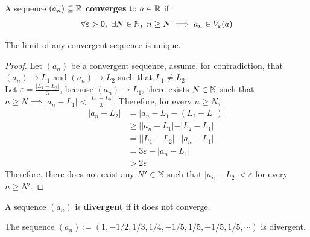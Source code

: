\documentclass[11pt]{article}
\begin{document}
	\begin{definition}
		A sequence $(a_n) \subseteq \mathbb{R}$ \textbf{converges} to $a \in \mathbb{R}$ if 
		\begin{align}
			\forall \varepsilon > 0,\ \exists N \in \mathbb{N},\ n \geq N \implies a_n \in V_\varepsilon(a)
		\end{align}
	\end{definition}
	
	\begin{theorem}
		The limit of any convergent sequence is unique.
	\end{theorem}
	
	\begin{proof}
		Let $(a_n)$ be a convergent sequence, assume, for contradiction, that $(a_n) \to L_1$ and $(a_n) \to L_2$ such that $L_1 \neq L_2$.\\
		Let $\varepsilon = \frac{|L_1 - L_2|}{3}$, because $(a_n) \to L_1$, there exists $N\in\mathbb{N}$ such that $n \geq N \implies |a_n - L_1| < \frac{|L_1 - L_2|}{3}$. Therefore, for every $n \geq N$,
		\begin{align}
			|a_n - L_2| &= |a_n - L_1 - (L_2 - L_1)| \\ 
			&\geq ||a_n - L_1| - |L_2 - L_1|| \\
			&= ||L_1 - L_2| - |a_n - L_1|| \\
			&= 3\varepsilon - |a_n - L_1| \\
			&> 2 \varepsilon
		\end{align}
		Therefore, there does not exist any $N' \in \mathbb{N}$ such that $|a_n - L_2| < \varepsilon$ for every $n \geq N'$.
	\end{proof}
	
	\begin{definition}
		A sequence $(a_n)$ is \textbf{divergent} if it does not converge.
	\end{definition}
	
	\begin{example}
		The sequence $(a_n) := (1, -1/2, 1/3, 1/4, -1/5, 1/5, -1/5, 1/5, \cdots)$ is divergent.
	\end{example}
	
\end{document}
